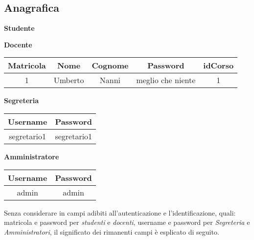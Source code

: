 \documentclass [a4paper,11pt]{book}
\begin{document}
\subsection{Anagrafica}

\textbf{Studente}

\medskip


\medskip

\textbf{Docente}

\medskip

\begin{tabular}{|c|c|c|c|c|}
\hline
Matricola & Nome & Cognome & Password & idCorso\\
\hline
1 & Umberto & Nanni & meglio che niente & 1\\
\hline
\end{tabular}

\medskip

\textbf{Segreteria}

\medskip

\begin{tabular}{|c|c|}
\hline
Username & Password \\
\hline
segretario1 & segretario1\\
\hline
\end{tabular}

\medskip

\textbf{Amministratore}

\medskip


\begin{tabular}{|c|c|}
\hline
Username & Password \\
\hline
admin & admin\\
\hline
\end{tabular}

\medskip
\medskip

Senza considerare in campi adibiti all'autenticazione e l'identificazione, quali: matricola e password per \emph{studenti} e \emph{docenti}, username e password per \emph{Segreteria} e \emph{Amministratori}, il significato dei rimanenti campi è esplicato di seguito.
\end{document}

